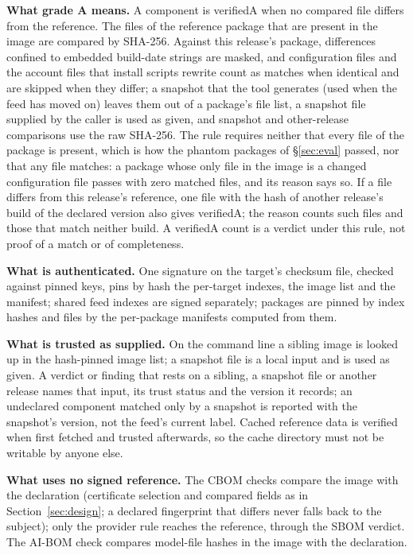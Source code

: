 \documentclass[sigconf,nonacm]{acmart}
\newcommand{\ubreak}{\textunderscore\allowbreak}
\newcommand{\vd}[1]{{\ttfamily\let\_\ubreak #1}}
\begin{document}
\textbf{What grade A means.} A component is \vd{verified\_A} when no compared file differs from the reference. The files of the reference package that are present in the image are compared by SHA-256. Against this release's package, differences confined to embedded build-date strings are masked, and configuration files and the account files that install scripts rewrite count as matches when identical and are skipped when they differ; a snapshot that the tool generates (used when the feed has moved on) leaves them out of a package's file list, a snapshot file supplied by the caller is used as given, and snapshot and other-release comparisons use the raw SHA-256. The rule requires neither that every file of the package is present, which is how the \missPhantom{} phantom packages of \S\ref{sec:eval} passed, nor that any file matches: a package whose only file in the image is a changed configuration file passes with zero matched files, and its reason says so. If a file differs from this release's reference, one file with the hash of another release's build of the declared version also gives \vd{verified\_A}; the reason counts such files and those that match neither build. A \vd{verified\_A} count is a verdict under this rule, not proof of a match or of completeness.

\textbf{What is authenticated.} One signature on the target's checksum file, checked against pinned keys, pins by hash the per-target indexes, the image list and the manifest; shared feed indexes are signed separately; packages are pinned by index hashes and files by the per-package manifests computed from them.

\textbf{What is trusted as supplied.} On the command line a sibling image is looked up in the hash-pinned image list; a snapshot file is a local input and is used as given. A verdict or finding that rests on a sibling, a snapshot file or another release names that input, its trust status and the version it records; an undeclared component matched only by a snapshot is reported with the snapshot's version, not the feed's current label. Cached reference data is verified when first fetched and trusted afterwards, so the cache directory must not be writable by anyone else.

\textbf{What uses no signed reference.} The CBOM checks compare the image with the declaration (certificate selection and compared fields as in Section~\ref{sec:design}; a declared fingerprint that differs never falls back to the subject); only the provider rule reaches the reference, through the SBOM verdict. The AI-BOM check compares model-file hashes in the image with the declaration.
\end{document}
